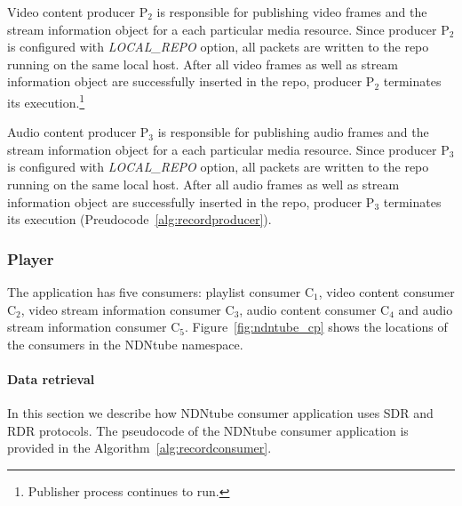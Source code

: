 Video content producer P$_{\text{2}}$ is responsible for publishing video frames and the stream information object for a each particular media resource. Since producer P$_{\text{2}}$ is configured with \textit{LOCAL\_REPO} option, all packets are written to the repo running on the same local host. After all video frames as well as stream information object are successfully inserted in the repo, producer P$_{\text{2}}$ terminates its execution.\footnote{Publisher process continues to run.} 

Audio content producer P$_{\text{3}}$ is responsible for publishing audio frames and the stream information object for a each particular media resource. Since producer P$_{\text{3}}$ is configured with \textit{LOCAL\_REPO} option, all packets are written to the repo running on the same local host. After all audio frames as well as stream information object are successfully inserted in the repo, producer P$_{\text{3}}$ terminates its execution (Preudocode~\ref{alg:recordproducer}).

\subsubsection{Player}

The application has five consumers: playlist consumer C$_{\text{1}}$, video content consumer C$_{\text{2}}$, video stream information consumer C$_{\text{3}}$, audio content consumer C$_{\text{4}}$ and audio stream information consumer C$_{\text{5}}$. Figure~\ref{fig:ndntube_cp} shows the locations of the consumers in the NDNtube namespace.


\paragraph{Data retrieval} %
\label{par:ndntube_data_retrieval}
\vspace{0.1cm}

In this section we describe how NDNtube consumer application uses SDR and RDR protocols. The pseudocode of the NDNtube consumer application is provided in the Algorithm~\ref{alg:recordconsumer}.


